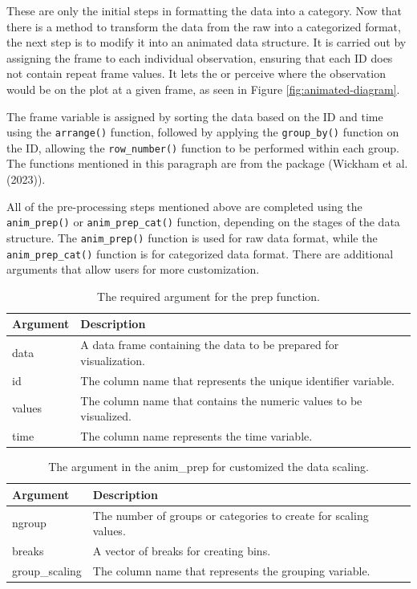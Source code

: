 These are only the initial steps in formatting the data into a category. Now that there is a method to transform the data from the raw into a categorized format, the next step is to modify it into an animated data structure. It is carried out by assigning the frame to each individual observation, ensuring that each ID does not contain repeat frame values. It lets the  or  perceive where the observation would be on the plot at a given frame, as seen in Figure \ref{fig:animated-diagram}.

The frame variable is assigned by sorting the data based on the ID and time using the \texttt{arrange()} function, followed by applying the \texttt{group\_by()} function on the ID, allowing the \texttt{row\_number()} function to be performed within each group. The functions mentioned in this paragraph are from the  package (Wickham et al. (2023)).

All of the pre-processing steps mentioned above are completed using the \texttt{anim\_prep()} or \texttt{anim\_prep\_cat()} function, depending on the stages of the data structure. The \texttt{anim\_prep()} function is used for raw data format, while the \texttt{anim\_prep\_cat()} function is for categorized data format. There are additional arguments that allow users for more customization.

\begin{table}

\caption{\label{tab:tbl-required}The required argument for the prep function.}
\centering
\begin{tabular}[t]{l|l}
\hline
Argument & Description\\
\hline
data & A data frame containing the data to be prepared for visualization.\\
\hline
id & The column name that represents the unique identifier variable.\\
\hline
values & The column name that contains the numeric values to be visualized.\\
\hline
time & The column name represents the time variable.\\
\hline
\end{tabular}
\end{table}

\begin{table}

\caption{\label{tab:tbl-animprep}The argument in the anim\_prep for customized the data scaling.}
\centering
\begin{tabular}[t]{l|l}
\hline
Argument & Description\\
\hline
ngroup & The number of groups or categories to create for scaling values.\\
\hline
breaks & A vector of breaks for creating bins.\\
\hline
group\_scaling & The column name that represents the grouping variable.\\
\hline
\end{tabular}
\end{table}

